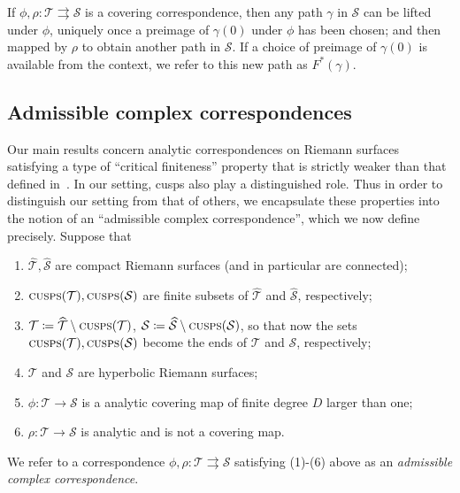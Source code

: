 \documentclass{amsart}
\theoremstyle{definition}
\theoremstyle{remark}
\newcommand{\cT}{\mathcal{T}}
\newcommand{\cS}{\mathcal{S}}
\newcommand{\cusps}[1]{\text{\sc cusps}(#1)}
\begin{document}
If $\phi, \rho\colon \cT \rightrightarrows\cS$ is a covering correspondence, then any path $\gamma$ in $\cS$ can be lifted under $\phi$, uniquely once a preimage of $\gamma(0)$ under $\phi$ has been chosen; and then mapped by $\rho$ to obtain another path in $\cS$. If a choice of preimage of $\gamma(0)$ is available from the context, we refer to this new path as $F^*(\gamma)$.

\subsection{Admissible complex correspondences}\label{subsecn:admissible}
Our main results concern analytic correspondences on Riemann surfaces satisfying a type of ``critical finiteness'' property that is strictly weaker than that defined in~\cite{MR1168195}.  In our setting, cusps also play a distinguished role. Thus in order to distinguish our setting from that of others, we encapsulate these properties into the notion of an ``admissible complex correspondence'', which we now define precisely. Suppose that
\begin{enumerate}
\item $\widehat{\cT}, \widehat{\cS}$ are compact Riemann surfaces (and in particular are connected);
\item $\cusps\cT, \cusps\cS$ are finite subsets of $\widehat{\cT}$ and $\widehat{\cS}$, respectively;
\item $\cT\coloneqq\widehat{\cT}\setminus \cusps\cT$, $\cS\coloneqq\widehat{\cS}\setminus \cusps\cS$, so that now the sets $\cusps{\cT}, \cusps{\cS}$ become the ends of $\cT$ and $\cS$, respectively;
\item $\cT$ and $\cS$ are hyperbolic Riemann surfaces; 
\item $\phi\colon \cT\to\cS$ is a analytic covering map of finite degree $D$ larger than one; 
\item $\rho\colon \cT\to\cS$ is analytic and is not a covering map.
\end{enumerate}

We refer to a correspondence $\phi, \rho\colon \cT \rightrightarrows\cS$ satisfying (1)-(6) above as an \emph{admissible complex correspondence}.  
\end{document}
